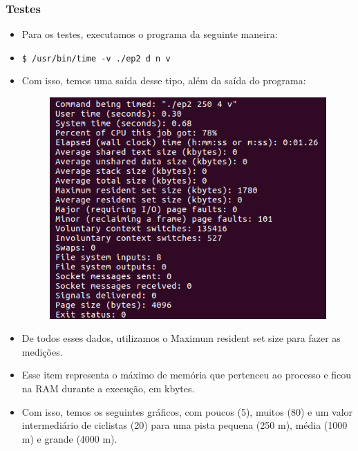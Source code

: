 \documentclass{beamer}
\begin{document}
\begin{frame}
	\frametitle{Testes}
	\begin{itemize}
		\item Para os testes, executamos o programa da seguinte maneira:
		\item \quad \texttt{\$ /usr/bin/time -v ./ep2 d n v}
		\item Com isso, temos uma saída desse tipo, além da saída do programa:
		\begin{figure}[!h]
			\centering
			\includegraphics[scale=0.4]{4.png}
		\end{figure}
	\end{itemize}
\end{frame}

\begin{frame}
	\begin{itemize}
		\item De todos esses dados, utilizamos o Maximum resident set size para fazer as medições.
		\item Esse item representa o máximo de memória que pertenceu ao processo e ficou na RAM durante a execução, em kbytes.
		\item Com isso, temos os seguintes gráficos, com poucos (5), muitos (80) e um valor intermediário de ciclistas (20) para uma pista pequena (250 m), média (1000 m) e grande (4000 m).
	\end{itemize}
\end{frame}
\end{document}
